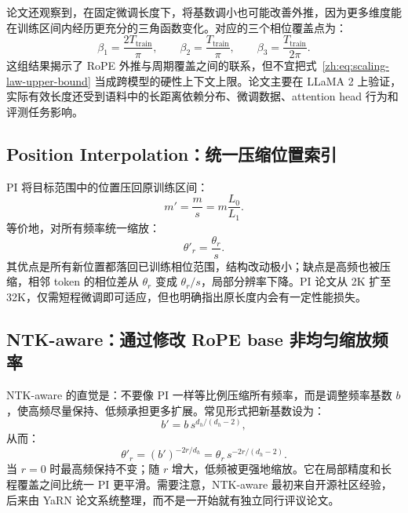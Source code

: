 \documentclass[UTF8,fontset=none,a4paper,10pt]{ctexart}
\begin{document}
论文还观察到，在固定微调长度下，将基数调小也可能改善外推，因为更多维度能在训练区间内经历更充分的三角函数变化。对应的三个相位覆盖点为：
\begin{equation}
  \beta_1=\frac{2T_{\mathrm{train}}}{\pi},\qquad
  \beta_2=\frac{T_{\mathrm{train}}}{\pi},\qquad
  \beta_3=\frac{T_{\mathrm{train}}}{2\pi}.
  \label{zh:eq:scaling-law-small-base}
\end{equation}
这组结果揭示了 RoPE 外推与周期覆盖之间的联系，但不宜把式~\eqref{zh:eq:scaling-law-upper-bound} 当成跨模型的硬性上下文上限。论文主要在 LLaMA 2 上验证，实际有效长度还受到语料中的长距离依赖分布、微调数据、attention head 行为和评测任务影响。

\subsection{Position Interpolation：统一压缩位置索引}

PI 将目标范围中的位置压回原训练区间\cite{zh:chen2023pi}：
\begin{equation}
  m'=\frac{m}{s}=m\frac{L_0}{L_1}.
  \label{zh:eq:pi-position}
\end{equation}
等价地，对所有频率统一缩放：
\begin{equation}
  \theta'_r=\frac{\theta_r}{s}.
  \label{zh:eq:pi-frequency}
\end{equation}
其优点是所有新位置都落回已训练相位范围，结构改动极小；缺点是高频也被压缩，相邻 token 的相位差从 $\theta_r$ 变成 $\theta_r/s$，局部分辨率下降。PI 论文从 2K 扩至 32K，仅需短程微调即可适应，但也明确指出原长度内会有一定性能损失\cite{zh:chen2023pi}。

\subsection{NTK-aware：通过修改 RoPE base 非均匀缩放频率}

NTK-aware 的直觉是：不要像 PI 一样等比例压缩所有频率，而是调整频率基数 $b$，使高频尽量保持、低频承担更多扩展。常见形式把新基数设为：
\begin{equation}
  b'=b\,s^{d_h/(d_h-2)},
  \label{zh:eq:ntk-base}
\end{equation}
从而：
\begin{equation}
  \theta'_r=(b')^{-2r/d_h}
  =\theta_r\,s^{-2r/(d_h-2)}.
  \label{zh:eq:ntk-frequency}
\end{equation}
当 $r=0$ 时最高频保持不变；随 $r$ 增大，低频被更强地缩放。它在局部精度和长程覆盖之间比统一 PI 更平滑。需要注意，NTK-aware 最初来自开源社区经验，后来由 YaRN 论文系统整理，而不是一开始就有独立同行评议论文\cite{zh:peng2024yarn}。
\end{document}
